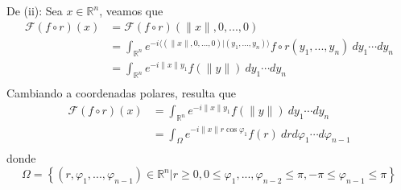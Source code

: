 \documentclass[12pt]{report}
\theoremstyle{largebreak}
\renewcommand{\leq}{\ensuremath{\leqslant}}
\renewcommand{\geq}{\ensuremath{\geqslant}}
\newcommand\norm[1]{\ensuremath{\|#1\|}}
\newcommand\pint[2]{\ensuremath{\langle#1| #2\rangle}}
\newcommand{\fou}[1]{\ensuremath{\mathcal{F}#1}}
\begin{document}
\begin{sol}
        De (ii): Sea $x\in\mathbb{R}^n$, veamos que
        \begin{equation*}
            \begin{split}
                \fou{(f\circ r)}(x)&=\fou{(f\circ r)}(\norm{x},0,...,0)\\
                &=\int_{\mathbb{R}^n}e^{-i\pint{(\norm{x},0,...,0)}{(y_1,...,y_n)}}f\circ r(y_1,...,y_n)\:dy_1\cdots dy_n\\
                &=\int_{\mathbb{R}^n}e^{ -i\norm{x}y_1}f(\norm{y})\:dy_1\cdots dy_n\\
            \end{split}
        \end{equation*}
        Cambiando a coordenadas polares, resulta que
        \begin{equation*}
            \begin{split}
                \fou{(f\circ r)}(x)&=\int_{\mathbb{R}^n}e^{ -i\norm{x}y_1}f(\norm{y})\:dy_1\cdots dy_n\\
                &=\int_{\Omega}e^{ -i\norm{x}r\cos\varphi_1}f(r)\: drd\varphi_1\cdots d\varphi_{ n-1}\\
            \end{split}
        \end{equation*}
        donde
        \begin{equation*}
            \Omega=\left\{(r,\varphi_1,...,\varphi_{ n-1})\in\mathbb{R}^n\Big|r\geq0,0\leq\varphi_1,...,\varphi_{ n-2}\leq\pi,-\pi\leq\varphi_{ n-1}\leq\pi \right\}
        \end{equation*}


\end{sol}
\end{document}

